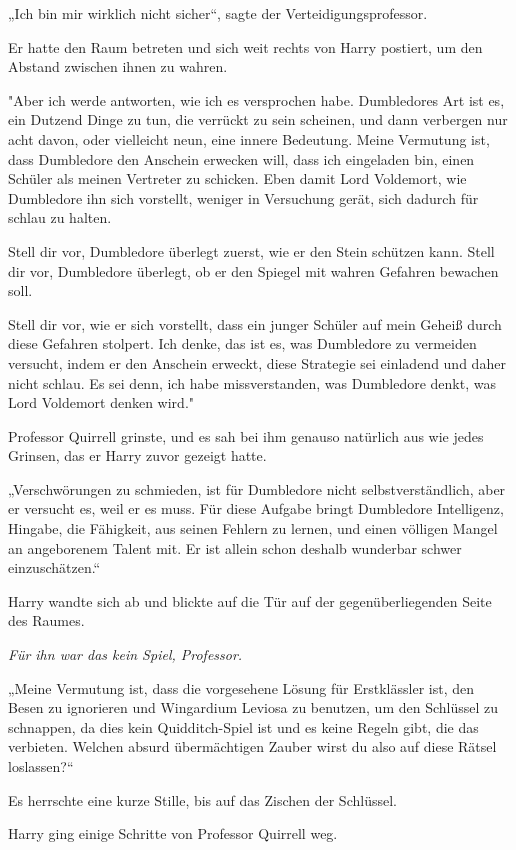 {„Ich bin mir wirklich nicht sicher“, sagte der Verteidigungsprofessor.

Er hatte den Raum betreten und sich weit rechts von Harry postiert, um den Abstand zwischen ihnen zu wahren.

"Aber ich werde antworten, wie ich es versprochen habe. Dumbledores Art ist es, ein Dutzend Dinge zu tun, die verrückt zu sein scheinen, und dann verbergen nur acht davon, oder vielleicht neun, eine innere Bedeutung. Meine Vermutung ist, dass Dumbledore den Anschein erwecken will, dass ich eingeladen bin, einen Schüler als meinen Vertreter zu schicken. Eben damit Lord Voldemort, wie Dumbledore ihn sich vorstellt, weniger in Versuchung gerät, sich dadurch für schlau zu halten.

Stell dir vor, Dumbledore überlegt zuerst, wie er den Stein schützen kann. Stell dir vor, Dumbledore überlegt, ob er den Spiegel mit wahren Gefahren bewachen soll.

Stell dir vor, wie er sich vorstellt, dass ein junger Schüler auf mein Geheiß durch diese Gefahren stolpert. Ich denke, das ist es, was Dumbledore zu vermeiden versucht, indem er den Anschein erweckt, diese Strategie sei einladend und daher nicht schlau. Es sei denn, ich habe missverstanden, was Dumbledore denkt, was Lord Voldemort denken wird."

Professor Quirrell grinste, und es sah bei ihm genauso natürlich aus wie jedes Grinsen, das er Harry zuvor gezeigt hatte.

„Verschwörungen zu schmieden, ist für Dumbledore nicht selbstverständlich, aber er versucht es, weil er es muss. Für diese Aufgabe bringt Dumbledore Intelligenz, Hingabe, die Fähigkeit, aus seinen Fehlern zu lernen, und einen völligen Mangel an angeborenem Talent mit. Er ist allein schon deshalb wunderbar schwer einzuschätzen.“

Harry wandte sich ab und blickte auf die Tür auf der gegenüberliegenden Seite des Raumes.

\emph{Für ihn war das kein Spiel, Professor.}

„Meine Vermutung ist, dass die vorgesehene Lösung für Erstklässler ist, den Besen zu ignorieren und Wingardium Leviosa zu benutzen, um den Schlüssel zu schnappen, da dies kein Quidditch-Spiel ist und es keine Regeln gibt, die das verbieten. Welchen absurd übermächtigen Zauber wirst du also auf diese Rätsel loslassen?“

Es herrschte eine kurze Stille, bis auf das Zischen der Schlüssel.

Harry ging einige Schritte von Professor Quirrell weg.

}
